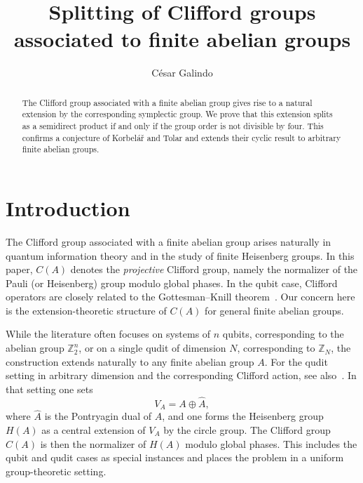 \documentclass[11pt, reqno]{amsart}
\title{Splitting of Clifford groups associated to finite abelian groups}
\author{C\'esar Galindo}
\date{}
\theoremstyle{definition}
\theoremstyle{remark}
\newcommand{\Z}{\mathbb{Z}}
\begin{document}
\begin{abstract}
The Clifford group associated with a finite abelian group gives rise to a natural extension by the corresponding symplectic group. We prove that this extension splits as a semidirect product if and only if the group order is not divisible by four. This confirms a conjecture of Korbe\-l\'a\v{r} and Tolar and extends their cyclic result to arbitrary finite abelian groups.
\end{abstract}


\maketitle


\section{Introduction}\label{sec:Intro}

The Clifford group associated with a finite abelian group arises naturally in quantum information theory and in the study of finite Heisenberg groups. In this paper, $C(A)$ denotes the \emph{projective} Clifford group, namely the normalizer of the Pauli (or Heisenberg) group modulo global phases. In the qubit case, Clifford operators are closely related to the Gottesman--Knill theorem~\cite{Gottesman1997,Gottesman1998,AaronsonGottesman2004}. Our concern here is the extension-theoretic structure of $C(A)$ for general finite abelian groups.

While the literature often focuses on systems of $n$ qubits, corresponding to the abelian group $\Z_2^n$, or on a single qudit of dimension $N$, corresponding to $\Z_N$, the construction extends naturally to any finite abelian group $A$. For the qudit setting in arbitrary dimension and the corresponding Clifford action, see also~\cite{Hostens2005}. In that setting one sets
\[
V_A = A \oplus \widehat{A},
\]
where $\widehat{A}$ is the Pontryagin dual of $A$, and one forms the Heisenberg group $H(A)$ as a central extension of $V_A$ by the circle group. The Clifford group $C(A)$ is then the normalizer of $H(A)$ modulo global phases. This includes the qubit and qudit cases as special instances and places the problem in a uniform group-theoretic setting.
\end{document}
